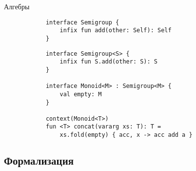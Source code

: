 \documentclass[aspectratio=169,usenames,dvipsnames]{beamer}
\begin{document}
    \begin{frame}[fragile]{Алгебры}
        \begin{verbatim}
            interface Semigroup {
                infix fun add(other: Self): Self
            }
        \end{verbatim}

        \vspace{1em}
        \begin{verbatim}
            interface Semigroup<S> {
                infix fun S.add(other: S): S
            }

            interface Monoid<M> : Semigroup<M> {
                val empty: M
            }

            context(Monoid<T>)
            fun <T> concat(vararg xs: T): T =
                xs.fold(empty) { acc, x -> acc add a }
        \end{verbatim}
    \end{frame}


    \subsection{Формализация}
\end{document}
